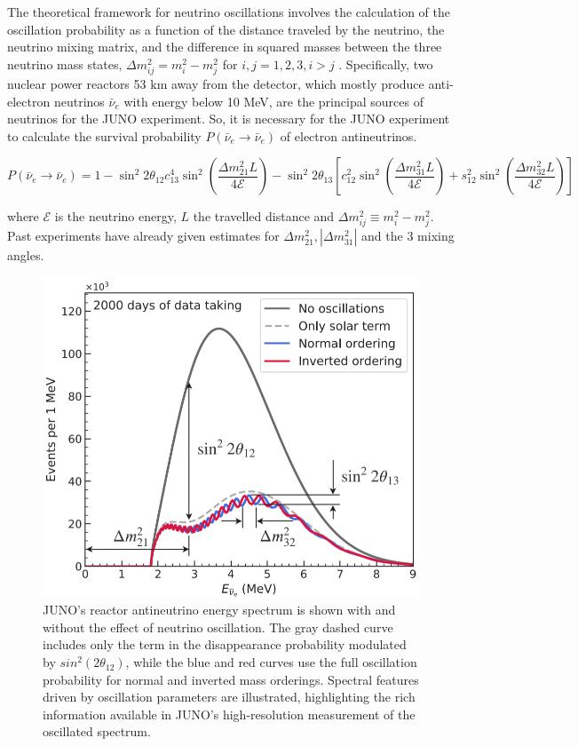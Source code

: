 The theoretical framework for neutrino oscillations involves the calculation of the oscillation probability as a function of the distance traveled by the neutrino, the neutrino mixing matrix, and the difference in squared masses between the three neutrino mass states, $\Delta m_{ij}^2 = m^2_i - m^2_j$ for $i,j = 1,2,3, i>j$ . Specifically, two nuclear power reactors 53 $\unit{\kilo\meter}$ away from the detector, which mostly produce anti-electron neutrinos $\bar{\nu}_e$ with energy below 10 MeV, are the principal sources of neutrinos for the JUNO experiment. So, it is necessary for the JUNO experiment to calculate the survival probability $P\left(\bar{\nu}_e \rightarrow \bar{\nu}_e\right)$ of electron antineutrinos.

\begin{equation*}
	P\left(\bar{\nu}_e \rightarrow \bar{\nu}_e\right)=1-\sin ^2 2 \theta_{12} c_{13}^4 \sin ^2\left(\frac{\Delta m_{21}^2 L}{4 \mathcal{E}}\right)-\sin ^2 2 \theta_{13}\left[c_{12}^2 \sin ^2\left(\frac{\Delta m_{31}^2 L}{4 \mathcal{E}}\right)+s_{12}^2 \sin ^2\left(\frac{\Delta m_{32}^2 L}{4 \mathcal{E}}\right)\right]
\end{equation*}

where $\mathcal{E}$ is the neutrino energy, $L$ the travelled distance and $\Delta m_{i j}^2 \equiv m_i^2-m_j^2$. \\
Past experiments have already given estimates for  $\Delta m_{21}^2,\left|\Delta m_{31}^2\right|$ and the  3 mixing angles.


\begin{figure}[h]
	\centering
	\includegraphics[width=0.3\linewidth]{Images/antineutino_to_antineutrino_probability_plot}
	\caption{JUNO's reactor antineutrino energy spectrum is shown with and without the effect of neutrino oscillation. The gray dashed curve includes only the term in the disappearance probability modulated by $sin^2(2\theta_{12})$, while the blue and red curves use the full oscillation probability for normal and inverted mass orderings. Spectral features driven by oscillation parameters are illustrated, highlighting the rich information available in JUNO's high-resolution measurement of the oscillated spectrum.}
	\label{fig:antineutinotoantineutrinoprobabilityplot}
\end{figure}



